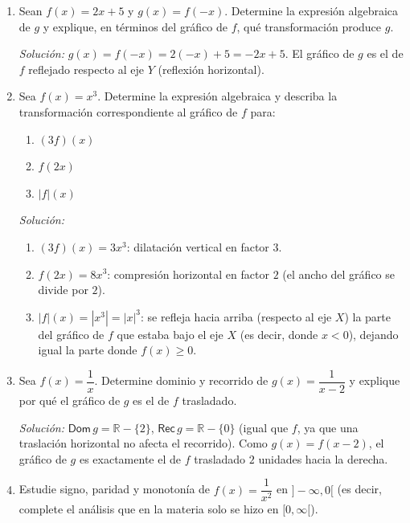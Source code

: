 \documentclass[11pt]{article}
\begin{document}
\begin{enumerate}[label=\arabic*.]
\textit{Solución:} $g(x)=|x-3|+1$. Como $|x-3| = x-3$ si $x\ge3$ y $|x-3|=3-x$ si $x<3$, se
tiene
$$g(x) = \begin{cases} x-2 & \text{si } x\ge3 \\ 4-x & \text{si } x<3. \end{cases}$$

\item Sean $f(x) = 2x+5$ y $g(x) = f(-x)$. Determine la expresión algebraica de
$g$ y explique, en términos del gráfico de $f$, qué transformación produce $g$.

\textit{Solución:} $g(x) = f(-x) = 2(-x)+5 = -2x+5$. El gráfico de $g$ es el de $f$ reflejado
respecto al eje $Y$ (reflexión horizontal).

\item Sea $f(x) = x^3$. Determine la expresión algebraica y describa la
transformación correspondiente al gráfico de $f$ para:
\begin{enumerate}[label=(\alph*)]
\item $(3f)(x)$
\item $f(2x)$
\item $|f|(x)$
\end{enumerate}

\textit{Solución:}
\begin{enumerate}[label=(\alph*)]
\item $(3f)(x) = 3x^3$: dilatación vertical en factor $3$.
\item $f(2x) = 8x^3$: compresión horizontal en factor $2$ (el ancho del gráfico se divide por
$2$).
\item $|f|(x) = |x^3| = |x|^3$: se refleja hacia arriba (respecto al eje $X$) la parte del
gráfico de $f$ que estaba bajo el eje $X$ (es decir, donde $x<0$), dejando igual la parte donde
$f(x)\ge0$.
\end{enumerate}

\item Sea $f(x) = \dfrac{1}{x}$. Determine dominio y recorrido de
$g(x) = \dfrac{1}{x-2}$ y explique por qué el gráfico de $g$ es el de $f$
trasladado.

\textit{Solución:} $\mathsf{Dom}\,g = \mathbb{R}-\{2\}$, $\mathsf{Rec}\,g = \mathbb{R}-\{0\}$
(igual que $f$, ya que una traslación horizontal no afecta el recorrido). Como
$g(x) = f(x-2)$, el gráfico de $g$ es exactamente el de $f$ trasladado $2$ unidades hacia la
derecha.

\item Estudie signo, paridad y monotonía de $f(x) = \dfrac{1}{x^2}$ en
$]-\infty,0[$ (es decir, complete el análisis que en la materia solo se hizo
en $[0,\infty[$).


\end{enumerate}
\end{document}
